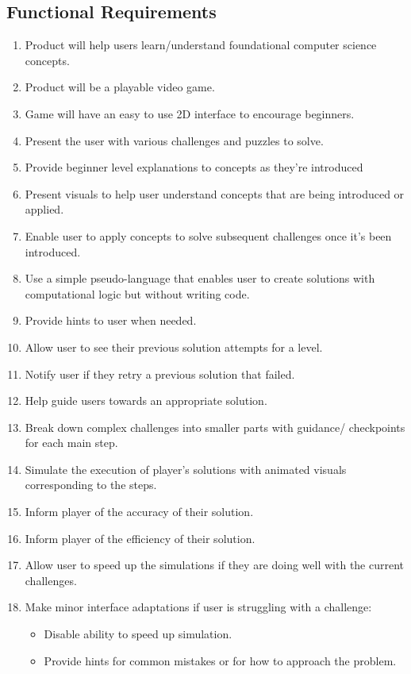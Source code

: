 \documentclass{article}
\begin{document}
\subsection{Functional Requirements}
\begin{enumerate}
  \item Product will help users learn/understand foundational computer science
  concepts.
  \item Product will be a playable video game.
  \item Game will have an easy to use 2D interface to encourage beginners.
  \item Present the user with various challenges and puzzles to solve.
  \item Provide beginner level explanations to concepts as they’re introduced
  \item Present visuals to help user understand concepts that are being
  introduced or applied.
  \item Enable user to apply concepts to solve subsequent challenges once it’s
  been introduced.
  \item Use a simple pseudo-language that enables user to create solutions with
  computational logic but without writing code.
  \item Provide hints to user when needed.
  \item Allow user to see their previous solution attempts for a level.
  \item Notify user if they retry a previous solution that failed.
  \item Help guide users towards an appropriate solution.
  \item Break down complex challenges into smaller parts with guidance/
  checkpoints for each main step.
  \item Simulate the execution of player’s solutions with animated visuals
  corresponding to the steps.
  \item Inform player of the accuracy of their solution.
  \item Inform player of the efficiency of their solution.
  \item Allow user to speed up the simulations if they are doing well with the
  current challenges.
  \item Make minor interface adaptations if user is struggling with a challenge:
  \begin{itemize}
    \item Disable ability to speed up simulation.
    \item Provide hints for common mistakes or for how to approach the problem.

\end{itemize}
\end{enumerate}
\end{document}
